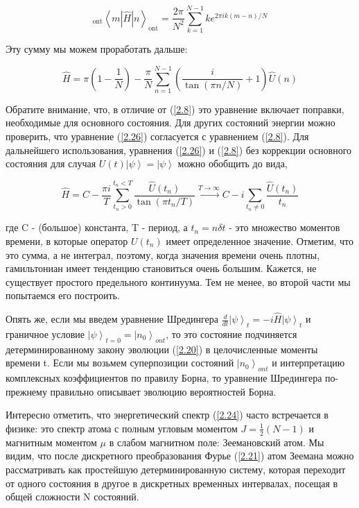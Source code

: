 \documentclass[main.tex]{subfiles}
\begin{document}
\begin{equation}\label{2.25}
	{}_\mathrm{ont}\left\langle m\left|\hat H\right| n\right\rangle_{\mathrm{ont}}=\frac{2 \pi}{N^{2}} \sum_{k=1}^{N-1} k e^{2 \pi i k(m-n) / N}
\end{equation}

Эту сумму мы можем проработать дальше:

\begin{equation}\label{2.26}
	\hat H=\pi\left(1-\frac{1}{N}\right)-\frac{\pi}{N} \sum_{n=1}^{N-1}\left(\frac{i}{\tan (\pi n / N)}+1\right) \hat U(n)
\end{equation}


Обратите внимание, что, в отличие от (\ref{2.8}) это уравнение включает поправки, необходимые для основного состояния. Для других состояний энергии можно проверить, что уравнение (\ref{2.26}) согласуется с уравнением (\ref{2.8}).
Для дальнейшего использования, уравнения (\ref{2.26}) и (\ref{2.8}) без коррекции основного состояния для случая $U(t)\left| \psi\right> = \left| \psi\right> $ можно обобщить до вида, 

\begin{equation}\label{2.27}
	\hat H = C-\frac{\pi i}{T} \sum_{t_{n}>0}^{t_{n}<T} \frac{\hat U\left(t_{n}\right)}{\tan \left(\pi t_{n} / T\right)} \stackrel{T \rightarrow \infty}{\longrightarrow} C-i \sum_{t_{n} \neq 0} \frac{\hat U\left(t_{n}\right)}{t_{n}}
\end{equation}


где C - (большое) константа, T - период, а $t_n = n\delta t$ - это множество моментов времени, в которые оператор $U(t_n)$ имеет определенное значение. Отметим, что это сумма, а не интеграл, поэтому, когда значения времени очень плотны, гамильтониан имеет тенденцию становиться очень большим. Кажется, не существует простого предельного континуума. Тем не менее, во второй части мы попытаемся его построить.
 
Опять же, если мы введем уравнение Шредингера $\frac d {dt} \left|\psi\right>_t = -i \hat H \left|\psi\right>_t  $ и граничное условие $\left|\psi\right>_{t=0} = \left|n_0\right>_{ont}$, то это состояние подчиняется детерминированному закону эволюции (\ref{2.20}) в целочисленные моменты времени t. Если мы возьмем суперпозиции состояний $\left|n_0\right>_{ont}$ и интерпретацию комплексных коэффициентов по правилу Борна, то уравнение Шредингера по-прежнему правильно описывает эволюцию вероятностей Борна.

Интересно отметить, что энергетический спектр (\ref{2.24}) часто встречается в физике: это спектр атома с полным угловым моментом $J = \frac 1 2 (N-1)$ и магнитным моментом $\mu$ в слабом магнитном поле: Зеемановский атом. Мы видим, что после дискретного преобразования Фурье (\ref{2.21}) атом Зеемана можно рассматривать как простейшую детерминированную систему, которая переходит от одного состояния в другое в дискретных временных интервалах, посещая в общей сложности N состояний.
\end{document}

